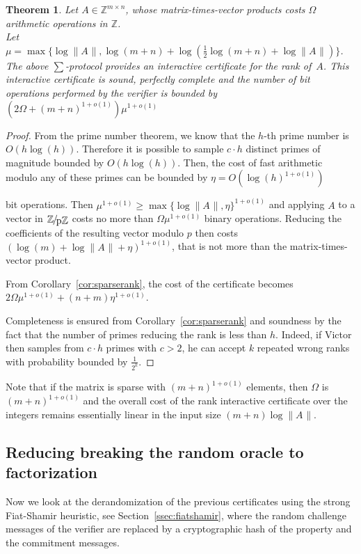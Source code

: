 \documentclass{article}
\newtheorem{theorem}{Theorem}
\newcommand{\Z}{\ensuremath{\mathbb Z}}\newcommand{\ZZ}{\Z}
\newcommand{\Zp}{\leavevmode\kern.1em\raise.0ex
  \hbox{\ensuremath{\mathbb{Z}}}\kern-.1em
  /\kern-.15em\lower.3ex\hbox{p\mbox{\ensuremath{\mathbb{Z}}}}\xspace}
\newcommand{\lognormA}{\log\| A\mspace{1mu} \|}
\begin{document}
\begin{theorem}
  Let $A\in\Z^{m\times n}$, whose matrix-times-vector products
  costs $\Omega$ arithmetic operations in $\Z$.\\
   
  Let {\small $\mu=\max\{\lognormA,\log(m+n)+\log(\frac{1}{2}\log(m+n)+\lognormA)\}$}.
  The above $\sum$-protocol provides an interactive certificate for the rank
  of~$A$.
  This interactive certificate is sound, perfectly complete and the number of
  bit operations performed by the verifier is bounded by 
  $\left(2\Omega+(m+n)^{1+o(1)}\right)\mu^{1+o(1)}$
\end{theorem}
\begin{proof}
From  
the prime number theorem, we know that the $h$-th prime number is 
$O(h \log(h))$. Therefore it is possible to sample $c \cdot h$ distinct primes of
magnitude bounded by $O(h \log(h))$. Then, the cost of fast arithmetic modulo
any of these primes can be bounded by
$\eta=O(\log(h)^{1+o(1)})$
 
bit operations.
Then $\mu^{1+o(1)}\geq \max\{\lognormA,\eta\}^{1+o(1)}$ and applying $A$ to a vector in
$\Zp$ costs no more than $\Omega\mu^{1+o(1)}$ binary operations. Reducing the
coefficients of the resulting vector modulo $p$ then costs
$\left(\log(m)+\lognormA+\eta\right)^{1+o(1)}$, that is not more than the
matrix-times-vector product. 
 
From  
Corollary~\ref{cor:sparserank}, the cost of the certificate becomes 
$2\Omega\mu^{1+o(1)}+(n+m)\eta^{1+o(1)}$.  

Completeness is ensured from Corollary~\ref{cor:sparserank} and soundness by the
fact that the number of primes reducing the rank is less than $h$. 
Indeed, if Victor then samples from $c\cdot h$ primes with $c>2$, he can accept
$k$ repeated wrong ranks with probability bounded by $\frac{1}{2^k}$.
\end{proof}
Note that if the matrix is sparse with $(m+n)^{1+o(1)}$ elements, then 
$\Omega$ is $(m+n)^{1+o(1)}$ and the overall cost of the rank interactive
certificate over the integers remains essentially linear in 
the input size  
$(m+n)\lognormA$.  

\subsection{Reducing breaking the random oracle to
  factorization}\label{ssec:bbs}
Now we look at the derandomization of the previous certificates using the strong
Fiat-Shamir heuristic, see Section~\ref{ssec:fiatshamir},
where the random challenge messages of the verifier are replaced by a
cryptographic hash of the property and the commitment messages.
\end{document}
